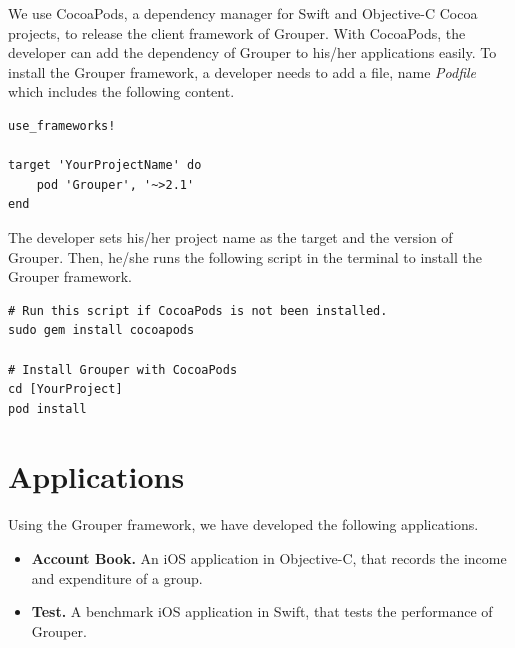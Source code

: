 \documentclass[a4paper,11pt]{report}
\begin{document}
We use CocoaPods\cite{cocoapods}, a dependency manager for Swift and Objective-C Cocoa projects, to release the client framework of Grouper.
With CocoaPods, the developer can add the dependency of Grouper to his/her applications easily.
To install the Grouper framework, a developer needs to add a file, name \emph{Podfile} which includes the following content.

\begin{lstlisting}[frame=none language=Ruby] 
use_frameworks!

target 'YourProjectName' do
    pod 'Grouper', '~>2.1'
end
\end{lstlisting}

The developer sets his/her project name as the target and the version of Grouper.
Then, he/she runs the following script in the terminal to install the Grouper framework.

\begin{lstlisting}[frame=none language=shell] 
# Run this script if CocoaPods is not been installed.
sudo gem install cocoapods

# Install Grouper with CocoaPods
cd [YourProject]
pod install
\end{lstlisting}

\section{Applications} \label{section:application}

Using the Grouper framework, we have developed the following applications. 

\begin{itemize}
	\setlength{\itemsep}{1pt}
	\setlength{\parskip}{0pt}
	\setlength{\parsep}{0pt}
	\item \textbf{Account Book.} An iOS application in Objective-C, that records the income and expenditure of a group.
	\item \textbf{Test.} A benchmark iOS application in Swift, that tests the performance of Grouper.
\end{itemize}
\end{document}
